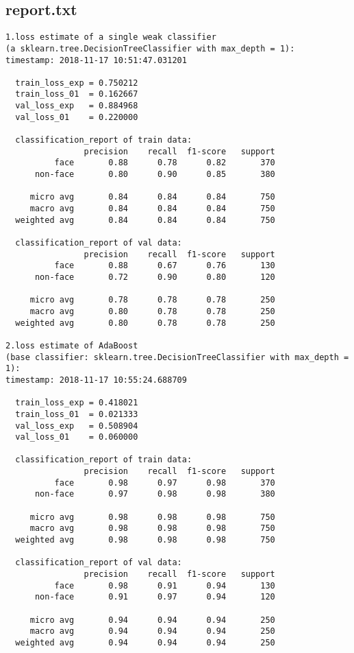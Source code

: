 \documentclass[journal, a4paper, onecolumn]{IEEEtran}
\begin{document}
\subsection{report.txt}\label{title:report.txt}
\begin{lstlisting}
1.loss estimate of a single weak classifier 
(a sklearn.tree.DecisionTreeClassifier with max_depth = 1):
timestamp: 2018-11-17 10:51:47.031201

  train_loss_exp = 0.750212
  train_loss_01  = 0.162667
  val_loss_exp   = 0.884968
  val_loss_01    = 0.220000

  classification_report of train data:
                precision    recall  f1-score   support
          face       0.88      0.78      0.82       370
      non-face       0.80      0.90      0.85       380

     micro avg       0.84      0.84      0.84       750
     macro avg       0.84      0.84      0.84       750
  weighted avg       0.84      0.84      0.84       750

  classification_report of val data:
                precision    recall  f1-score   support
          face       0.88      0.67      0.76       130
      non-face       0.72      0.90      0.80       120

     micro avg       0.78      0.78      0.78       250
     macro avg       0.80      0.78      0.78       250
  weighted avg       0.80      0.78      0.78       250
    
2.loss estimate of AdaBoost 
(base classifier: sklearn.tree.DecisionTreeClassifier with max_depth = 1):
timestamp: 2018-11-17 10:55:24.688709
    
  train_loss_exp = 0.418021
  train_loss_01  = 0.021333
  val_loss_exp   = 0.508904
  val_loss_01    = 0.060000

  classification_report of train data:
                precision    recall  f1-score   support
          face       0.98      0.97      0.98       370
      non-face       0.97      0.98      0.98       380

     micro avg       0.98      0.98      0.98       750
     macro avg       0.98      0.98      0.98       750
  weighted avg       0.98      0.98      0.98       750

  classification_report of val data:
                precision    recall  f1-score   support
          face       0.98      0.91      0.94       130
      non-face       0.91      0.97      0.94       120

     micro avg       0.94      0.94      0.94       250
     macro avg       0.94      0.94      0.94       250
  weighted avg       0.94      0.94      0.94       250
\end{lstlisting}
\end{document}
